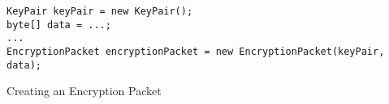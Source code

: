 \begin{listing}[H]
  \centering
  \begin{verbatim}
KeyPair keyPair = new KeyPair();
byte[] data = ...;
...
EncryptionPacket encryptionPacket = new EncryptionPacket(keyPair, data);
  \end{verbatim}
  \caption{Creating an Encryption Packet}
  \label{code:encryption_packet_instantiation}
\end{listing}

